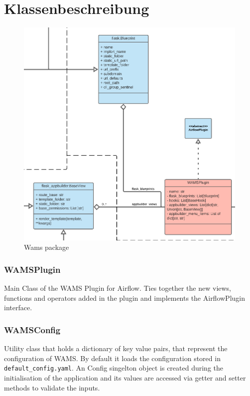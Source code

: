\chapter{Klassenbeschreibung}

\begin{figure}[ht]
    \centering
    \includegraphics[width=\textwidth]{Diagramme/KlassendiagrammAusschnitte/Klassendiagramm - wamsplugin.png}
    \caption{Wams package}
    \label{fig:WamsPlugin}
\end{figure}

\subsection{WAMSPlugin}
Main Class of the WAMS Plugin for Airflow. Ties together the new views, functions and operators added in the plugin and implements the AirflowPlugin interface.

\subsection{WAMSConfig}
Utility class that holds a dictionary of key value pairs, that represent the configuration of
WAMS. By default it loads the configuration stored in \verb!default_config.yaml!. An Config
singelton object is created during the initialisation of the application and its values are 
accessed via getter and setter methods to validate the inputs.

